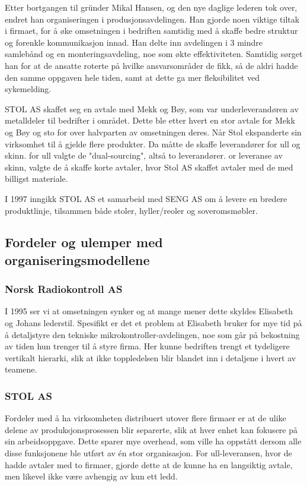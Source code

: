 Etter bortgangen til gründer Mikal Hansen, og den nye daglige lederen tok over, endret han organiseringen i produsjonsavdelingen.
Han gjorde noen viktige tiltak i firmaet, for å øke omsetningen i bedriften samtidig med å skaffe bedre struktur og forenkle kommunikasjon innad.
Han delte inn avdelingen i 3 mindre samlebånd og en monteringsavdeling, noe som økte effektiviteten. Samtidig sørget han for at de ansatte roterte på hvilke ansvarsområder de fikk, så de aldri hadde den samme oppgaven hele tiden, samt at dette ga mer fleksibilitet ved sykemelding.

STOL AS skaffet seg en avtale med Mekk og Bøy, som var underleverandøren av metalldeler til bedrifter i området. Dette ble etter hvert en stor avtale for Mekk og Bøy og sto for over halvparten av omsetningen deres. Når Stol ekspanderte sin virksomhet til å gjelde flere produkter. Da måtte de skaffe leverandører for ull og skinn. for ull valgte de "dual-sourcing", altså to leverandører. or leveranse av skinn, valgte de å skaffe korte avtaler, hvor Stol AS skaffet avtaler med de med billigst materiale.

I 1997 inngikk STOL AS et samarbeid med SENG AS om å levere en bredere produktlinje, tilsammen både stoler, hyller/reoler og soveromsmøbler.

\subsection{Fordeler og ulemper med organiseringsmodellene}

\subsubsection{Norsk Radiokontroll AS}

I 1995 ser vi at omsetningen synker og at mange mener dette skyldes Elisabeth og Johans lederstil. Spesifikt er det et problem at Elisabeth bruker for mye tid på å detaljstyre den tekniske mikrokontroller-avdelingen, noe som går på bekostning av tiden hun trenger til å styre firma.
Her kunne bedriften trengt et tydeligere vertikalt hierarki, slik at ikke toppledelsen blir blandet inn i detaljene i hvert av teamene.

\subsubsection{STOL AS}

Fordeler med å ha virksomheten distribuert utover flere firmaer er at de ulike delene av produksjonsprosessen blir separerte, slik at hver enhet kan fokusere på sin arbeidsoppgave.
Dette sparer mye overhead, som ville ha oppstått dersom alle disse funksjonene ble utført av én stor organisasjon.
For ull-leveransen, hvor de hadde avtaler med to firmaer, gjorde dette at de kunne ha en langsiktig avtale, men likevel ikke være avhengig av kun ett ledd.

